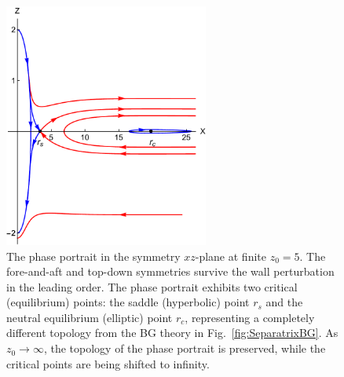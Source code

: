 \begin{figure}[t]
 \centering
\includegraphics[width=0.6\textwidth]{Schematics.pdf}
\caption{The phase portrait in the symmetry $xz$-plane at finite $z_0=5$. The fore-and-aft and top-down symmetries survive the wall perturbation in the leading order. The phase portrait exhibits two critical (equilibrium) points: the saddle (hyperbolic) point $r_s$ and the neutral equilibrium (elliptic) point $r_c$, representing a completely different topology from the BG theory in Fig.~\ref{fig:SeparatrixBG}. As $z_0 \to \infty$, the topology of the phase portrait is preserved, while the critical points are being shifted to infinity. }
\label{fig:Schematics}
\end{figure}

